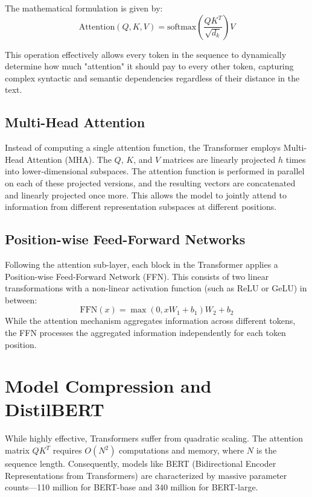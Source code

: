 The mathematical formulation is given by:
\begin{equation}
\text{Attention}(Q, K, V) = \text{softmax}\left(\frac{QK^T}{\sqrt{d_k}}\right)V
\end{equation}

This operation effectively allows every token in the sequence to dynamically determine how much "attention" it should pay to every other token, capturing complex syntactic and semantic dependencies regardless of their distance in the text.

\subsection{Multi-Head Attention}
Instead of computing a single attention function, the Transformer employs Multi-Head Attention (MHA). The $Q$, $K$, and $V$ matrices are linearly projected $h$ times into lower-dimensional subspaces. The attention function is performed in parallel on each of these projected versions, and the resulting vectors are concatenated and linearly projected once more. This allows the model to jointly attend to information from different representation subspaces at different positions.

\subsection{Position-wise Feed-Forward Networks}
Following the attention sub-layer, each block in the Transformer applies a Position-wise Feed-Forward Network (FFN). This consists of two linear transformations with a non-linear activation function (such as ReLU or GeLU) in between:
\begin{equation}
\text{FFN}(x) = \max(0, xW_1 + b_1)W_2 + b_2
\end{equation}
While the attention mechanism aggregates information across different tokens, the FFN processes the aggregated information independently for each token position.

\section{Model Compression and DistilBERT}
While highly effective, Transformers suffer from quadratic scaling. The attention matrix $QK^T$ requires $O(N^2)$ computations and memory, where $N$ is the sequence length. Consequently, models like BERT (Bidirectional Encoder Representations from Transformers) are characterized by massive parameter counts—110 million for BERT-base and 340 million for BERT-large.

